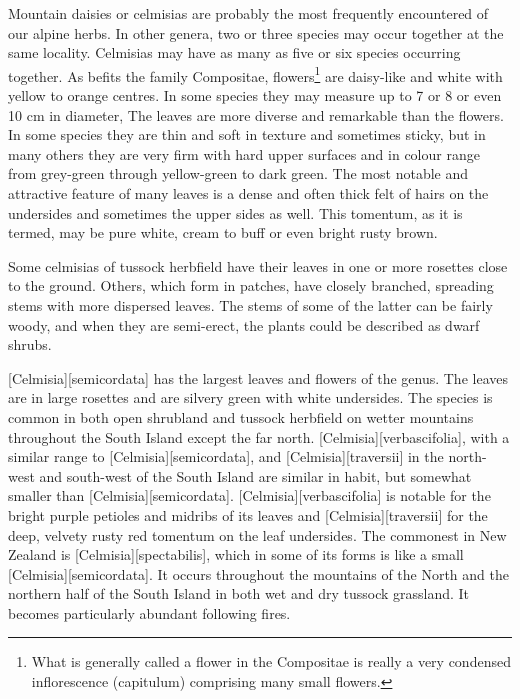 Mountain daisies or celmisias are probably the most frequently encountered of our alpine herbs.
In other genera, two or three species may occur together at the same locality.
Celmisias may have as many as five or six species occurring together.
As befits the family Compositae,  flowers\footnote{What is generally called a flower in the Compositae is really a very condensed inflorescence (capitulum) comprising many small flowers.} are daisy-like and white with yellow to orange centres.
In some species they may measure up to 7 or 8 or even 10 cm in diameter, The leaves are more diverse and remarkable than the flowers.
In some species they are thin and soft in texture and sometimes sticky, but in many others they are very firm with hard upper surfaces and in colour range from grey-green through yellow-green to dark green.
The most notable and attractive feature of many  leaves is a dense and often thick felt of hairs on the undersides and sometimes the upper sides as well.
This tomentum, as it is termed, may be pure white, cream to buff or even bright rusty brown.

Some celmisias of tussock herbfield have their leaves in one or more rosettes close to the ground.
Others, which form in patches, have closely branched, spreading stems with more dispersed leaves.
The stems of some of the latter can be fairly woody, and when they are semi-erect, the plants could be described as dwarf shrubs.

[Celmisia][semicordata] has the largest leaves and flowers of the genus.
The leaves are in large rosettes and are silvery green with white undersides.
The species is common in both open shrubland and tussock herbfield on wetter mountains throughout the South Island except the far north. [Celmisia][verbascifolia], with a similar range to [Celmisia][semicordata], and [Celmisia][traversii]  in the north-west and south-west of the South Island are similar in habit, but somewhat smaller than [Celmisia][semicordata]. [Celmisia][verbascifolia] is notable for the bright purple petioles and midribs of its leaves and [Celmisia][traversii] for the deep, velvety rusty red tomentum on the leaf undersides.
The commonest  in New Zealand is [Celmisia][spectabilis], which in some of its forms is like a small [Celmisia][semicordata].
It occurs throughout the mountains of the North and the northern half of the South Island in both wet and dry tussock grassland.
It becomes particularly abundant following fires.


